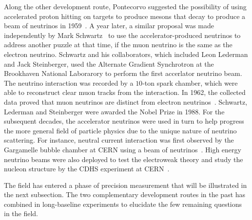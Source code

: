 Along the other development route, Pontecorvo suggested the possibility of using accelerated proton hitting on targets to produce mesons that decay to produce a beam of neutrinos in 1959~\cite{Pontecorvo:1959sn}.
A year later, a similar proposal was made independently by Mark Schwartz~\cite{Schwartz:1960hg} to use the accelerator-produced neutrinos to address another puzzle at that time, if the muon neutrino is the same as the electron neutrino.
Schwartz and his collaborators, which included Leon Lederman and Jack Steinberger, used the Alternate Gradient Synchrotron at the Brookhaven National Laborarory to perform the first accerlator neutrino beam. 
The neutrino interaction was recorded by a $10$-ton spark chamber, which were able to reconstruct clear muon tracks from the interaction.
In 1962, the collected data proved that muon neutrinos are distinct from electron neutrinos~\cite{Danby:1962nd}.
Schwartz, Lederman and Steinberger were awarded the Nobel Prize in 1988.
For the subsequent decades, the accelerator neutrinos were used in turn to help progress the more general field of particle physics due to the unique nature of neutrino scattering.
For instance, neutral current interaction was first observed by the Gargamelle bubble chamber at CERN using a beam of neutrinos~\cite{GargamelleNeutrino:1973jyy}.
High energy neutrino beams were also deployed to test the electroweak theory and study the nucleon structure by the CDHS experiment at CERN~\cite{Schlatter:2015nxk}.

The field has entered a phase of precision measurement that will be illustrated in the next subsection.
The two complementary development routes in the past has combined in long-baseline experiments to elucidate the few remaining questions in the field.



